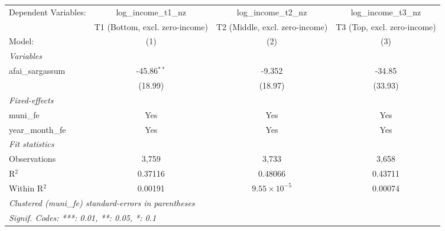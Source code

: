 \begingroup
\centering
\begin{tabular}{lccc}
   \tabularnewline \midrule \midrule
   Dependent Variables: & log\_income\_t1\_nz            & log\_income\_t2\_nz            & log\_income\_t3\_nz\\     
                        & T1 (Bottom, excl. zero-income) & T2 (Middle, excl. zero-income) & T3 (Top, excl. zero-income) \\   
   Model:               & (1)                            & (2)                            & (3)\\  
   \midrule
   \emph{Variables}\\
   afai\_sargassum      & -45.86$^{**}$                  & -9.352                         & -34.85\\   
                        & (18.99)                        & (18.97)                        & (33.93)\\   
   \midrule
   \emph{Fixed-effects}\\
   muni\_fe             & Yes                            & Yes                            & Yes\\  
   year\_month\_fe      & Yes                            & Yes                            & Yes\\  
   \midrule
   \emph{Fit statistics}\\
   Observations         & 3,759                          & 3,733                          & 3,658\\  
   R$^2$                & 0.37116                        & 0.48066                        & 0.43711\\  
   Within R$^2$         & 0.00191                        & $9.55\times 10^{-5}$           & 0.00074\\  
   \midrule \midrule
   \multicolumn{4}{l}{\emph{Clustered (muni\_fe) standard-errors in parentheses}}\\
   \multicolumn{4}{l}{\emph{Signif. Codes: ***: 0.01, **: 0.05, *: 0.1}}\\
\end{tabular}
\par\endgroup
